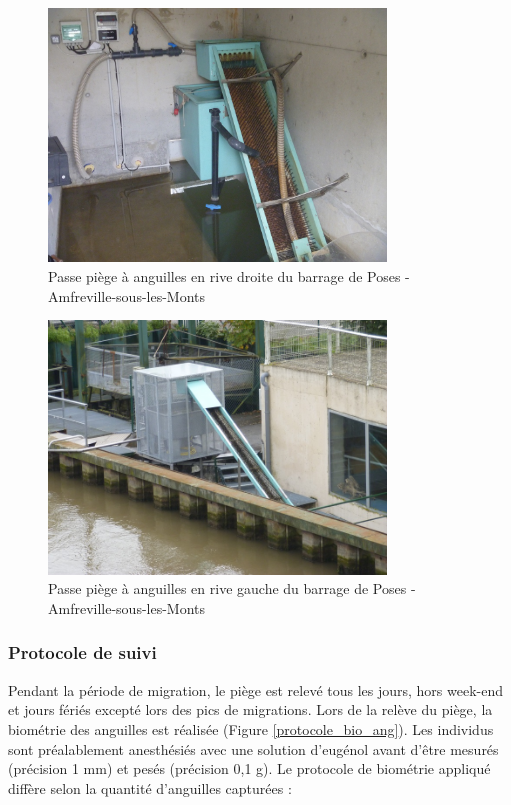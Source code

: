 \documentclass[11pt,titlepage,twoside]{article}\usepackage[]{graphicx}\usepackage[table]{xcolor}
\begin{document}
\begin{figure}[htpb]
\centering
\includegraphics[width=0.8\textwidth]{passe_ang_rd_poses}
\caption{Passe piège à anguilles en rive droite du barrage de Poses - Amfreville-sous-les-Monts}
\label{passe_ang_rd_poses}
\end{figure}

\begin{figure}[htpb]
\centering
\includegraphics[width=0.8\textwidth]{passe_ang_rg_poses}
\caption{Passe piège à anguilles en rive gauche du barrage de Poses - Amfreville-sous-les-Monts}
\label{passe_ang_rg_poses}
\end{figure}

\subsubsection{Protocole de suivi}

Pendant la période de migration, le piège est relevé tous les jours, hors week-end et jours fériés excepté lors des pics de migrations. Lors de la relève du piège, la biométrie des anguilles est réalisée (Figure \ref{protocole_bio_ang}). Les individus sont préalablement anesthésiés avec une solution d'eugénol avant d'être mesurés (précision 1 mm) et pesés (précision 0,1 g). Le protocole de biométrie appliqué diffère selon la quantité d'anguilles capturées :
\end{document}
